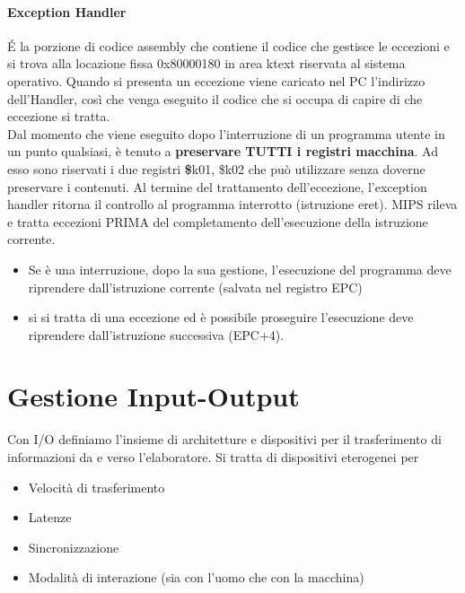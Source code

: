 \documentclass[12pt, a4paper, openany]{book}
\begin{document}
\subsubsection*{Exception Handler}
\'E la porzione di codice assembly che contiene il codice che gestisce le eccezioni
e si trova alla locazione fissa 0x80000180 in area ktext riservata al sistema operativo.
Quando si presenta un eccezione viene caricato nel PC l'indirizzo dell'Handler, così che
venga eseguito il codice che si occupa di capire di che eccezione si tratta.
\\ Dal momento che viene eseguito dopo l'interruzione di un programma utente in un punto
qualsiasi, è tenuto a \textbf{preservare TUTTI i registri macchina}. Ad esso sono riservati
i due registri \textbf \$k01, \$k02 che può utilizzare senza doverne preservare i contenuti.
Al termine del trattamento dell'eccezione, l'exception handler ritorna il controllo al programma
interrotto (istruzione eret).
MIPS rileva e tratta eccezioni PRIMA del completamento dell'esecuzione della istruzione corrente.
\begin{itemize}
    \item Se è una interruzione, dopo la sua gestione, l'esecuzione del programma deve
    riprendere dall'istruzione corrente (salvata nel registro EPC)
    \item si si tratta di una eccezione ed è possibile proseguire l'esecuzione deve riprendere
    dall'istruzione successiva (EPC+4).
\end{itemize}



\chapter{Gestione Input-Output}
Con I/O definiamo l'insieme di architetture e dispositivi per il trasferimento di informazioni da 
e verso l'elaboratore. Si tratta di dispositivi eterogenei per
\begin{itemize}
    \item Velocità di trasferimento
    \item Latenze
    \item Sincronizzazione
    \item Modalità di interazione (sia con l'uomo che con la macchina)
\end{itemize}
\end{document}
